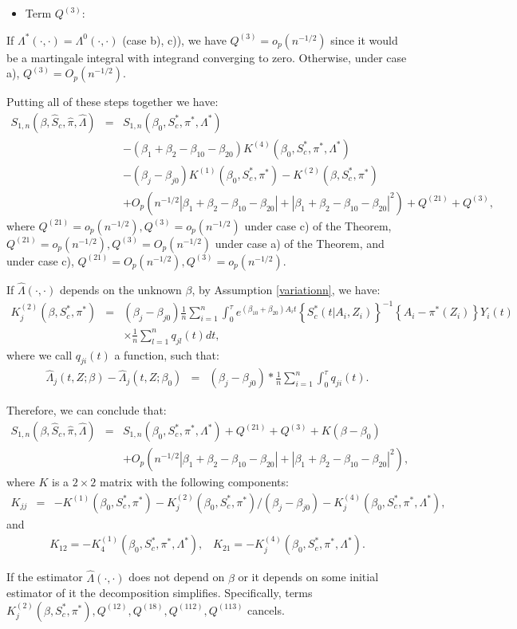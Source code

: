 \documentclass[11pt]{article}
\newcommand{\ee}{\end{eqnarray}}
\newcommand{\eqnn}{\begin{eqnarray*}}
\newcommand{\een}{\end{eqnarray*}}
\newcommand{\be}{\begin{eqnarray}}
\begin{document}
\begin{newproof7}
\begin{itemize}
\item{Term $Q^{(3)}$:}
\end{itemize}
If $\Lambda^{*}(\cdot,\cdot)=\Lambda^{0}(\cdot,\cdot)$ (case b), c)), we have $Q^{(3)}=o_p(n^{-1/2})$ since it would be a martingale integral with integrand converging to zero. Otherwise, under case a), $Q^{(3)}=O_p(n^{-1/2})$.

Putting all of these steps together we have:
\eqnn
{S}_{1,n}(\beta, \hat S_c,  \hat \pi, \hat \Lambda)&=&{S}_{1,n}(\beta_0, S^{*}_c,  \pi^{*}, \Lambda^{*})\\
&&-(\beta_1+\beta_2-\beta_{10}-\beta_{20})K^{(4)}(\beta_0, S^{*}_c, \pi^{*}, \Lambda^{*})\\
&&-(\beta_j-\beta_{j0})K^{(1)}(\beta_0,S^{*}_c,\pi^{*})-K^{(2)}(\beta,  S^{*}_c,\pi^{*})\\
&&+O_p\left(n^{-1/2}\left|\beta_1+\beta_2-\beta_{10}-\beta_{20}\right|+\left|\beta_1+\beta_2-\beta_{10}-\beta_{20}\right|^2\right)+Q^{(21)}+Q^{(3)},
\een
where $Q^{(21)}=o_p(n^{-1/2}),Q^{(3)}=o_p(n^{-1/2})$ under case c) of the Theorem, $Q^{(21)}=o_p(n^{-1/2}),Q^{(3)}=O_p(n^{-1/2})$ under case a) of the Theorem, and under case c), $Q^{(21)}=O_p(n^{-1/2}),Q^{(3)}=o_p(n^{-1/2})$.

If $\hat \Lambda(\cdot,\cdot)$ depends on the unknown $\beta$, by Assumption \ref{variationn}, we have:
\eqnn
K^{(2)}_j(\beta,S^{*}_c, \pi^{*})&=&(\beta_j-\beta_{j0})\frac{1}{n}\sum_{i=1}^n\int_0^\tau e^{ (\beta_{10}  + \beta_{20}) A_i t}\left\{S^{*}_c(t | A_i,Z_i)\right\}^{-1}\left\{A_i -\pi^{*}( Z_i)\right\}Y_i(t)
\\&&\times\frac{1}{n}\sum_{l=1}^nq_{jl}(t)dt,\een
where we call $q_{ji}(t)$ a function, such that:
\be
\hat \Lambda_{j}(t, Z ; \beta)-\hat \Lambda_{j}(t, Z ; \beta_0)&=&(\beta_j-\beta_{j0})*\frac{1}{n}\sum_{i=1}^n\int_0^\tau q_{ji}(t).
\ee


Therefore, we can conclude that:
\eqnn
{S}_{1,n}(\beta, \hat S_c,  \hat \pi, \hat \Lambda)&=&{S}_{1,n}(\beta_0, S^{*}_c,  \pi^{*}, \Lambda^{*})+Q^{(21)}+Q^{(3)}+{K}({\beta}-{\beta}_0)\\
&&+O_p\left(n^{-1/2}\left|\beta_1+\beta_2-\beta_{10}-\beta_{20}\right|+\left|\beta_1+\beta_2-\beta_{10}-\beta_{20}\right|^2\right),\een
where
${K}$ is a $2\times2$ matrix with the following components:
\eqnn
{K}_{jj}&=&-K^{(1)}(\beta_0,S^{*}_c, \pi^{*})-K^{(2)}_j(\beta_0,S^{*}_c,\pi^{*})/(\beta_j-\beta_{j0})-K^{(4)}_j(\beta_0,S^{*}_c,\pi^{*},\Lambda^{*}),
\een
and
\eqnn
{K}_{12}=-K^{(1)}_{4}(\beta_0,S^{*}_c,\pi^{*},\Lambda^{*}),\;\;\;{K}_{21}=-K^{(4)}_j(\beta_0,S^{*}_c,\pi^{*},\Lambda^{*}).
\een
\begin{remark}
If the estimator $\hat \Lambda(\cdot,\cdot)$ does not depend on $\beta$ or it depends on some initial estimator of it the decomposition simplifies.
Specifically, terms  $K^{(2)}_j(\beta, S^{*}_c, \pi^{*}),Q^{(12)},Q^{(18)},Q^{(112)},Q^{(113)}$ cancels.\end{remark}
\end{newproof7}
\end{document}
